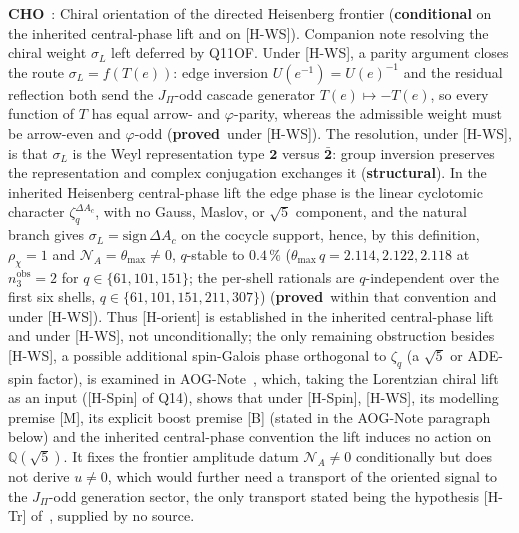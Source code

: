 \documentclass[11pt,a4paper]{article}
\newcommand{\sproved}{\textcolor{cproved}{\textbf{proved}}}
\newcommand{\sstruct}{\textcolor{cstruct}{\textbf{structural}}}
\newcommand{\scond}{\textcolor{ccond}{\textbf{conditional}}}
\begin{document}
    \textbf{CHO}~\cite{Beau2026cho}: Chiral orientation of the directed Heisenberg frontier
    (\scond{} on the inherited central-phase lift and on [H-WS]). Companion note resolving the chiral weight $\sigma_L$
    left deferred by Q11OF. Under [H-WS], a parity argument
    closes the route $\sigma_L = f(T(e))$: edge inversion $U(e^{-1}) = U(e)^{-1}$ and the residual reflection both
    send the $J_\Pi$-odd cascade generator $T(e) \mapsto -T(e)$, so every function of $T$ has equal arrow- and
    $\varphi$-parity, whereas the admissible weight must be arrow-even and $\varphi$-odd (\sproved\ under [H-WS]).
    The resolution, under [H-WS], is that $\sigma_L$ is the Weyl representation type $\mathbf{2}$ versus
    $\bar{\mathbf{2}}$: group inversion preserves the representation and complex conjugation exchanges it (\sstruct).
    In the inherited Heisenberg central-phase lift the edge phase is the linear cyclotomic character
    $\zeta_q^{\Delta A_c}$, with no Gauss, Maslov, or $\sqrt{5}$ component, and the natural branch gives
    $\sigma_L = \mathrm{sign}\,\Delta A_c$ on the cocycle support, hence, by this definition,
    $\rho_\chi = 1$ and $\mathcal{N}_A = \theta_{\max} \neq 0$, $q$-stable to $0.4\,\%$
    ($\theta_{\max}\,q = 2.114, 2.122, 2.118$ at $n_3^{\mathrm{obs}} = 2$ for $q \in \{61,101,151\}$; the per-shell
    rationals are $q$-independent over the first six shells, $q \in \{61,101,151,211,307\}$) (\sproved\ within that convention and under [H-WS]).
    Thus [H-orient] is established in the inherited central-phase lift and under [H-WS], not unconditionally; the only
    remaining obstruction besides [H-WS], a possible additional spin-Galois phase orthogonal to $\zeta_q$ (a
    $\sqrt{5}$ or ADE-spin factor), is examined in AOG-Note~\cite{Beau2026aog}, which, taking the Lorentzian chiral
    lift as an input ([H-Spin] of Q14), shows that under [H-Spin], [H-WS], its modelling premise [M], its explicit boost
    premise [B] (stated in the AOG-Note paragraph below) and the inherited central-phase convention the lift induces no
    action on $\mathbb{Q}(\sqrt{5})$.
    It fixes the frontier amplitude datum $\mathcal{N}_A \neq 0$ conditionally but does not derive $u \neq 0$, which
    would further need a transport of the oriented signal to the $J_\Pi$-odd generation sector, the only transport
    stated being the hypothesis [H-Tr] of~\cite{Beau2026prs}, supplied by no source.
\end{document}
